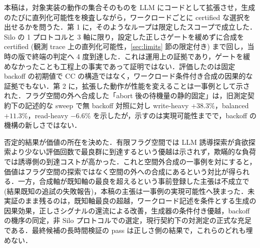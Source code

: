 \documentclass[submit,techrep,noauthor]{ipsj}
\begin{document}
本稿は，対象実装の動作の集合そのものを LLM にコードとして拡張させ，生成のたびに直列化可能性を検査しながら，ワークロードごとに certified な選択を出せるかを問うた．第 1 に，そのようなループは限定したスコープで成立した．Silo の 1 プロトコルと 3 軸に限り，設定した正しさゲートを緩めずに合成を certified (観測 trace 上の直列化可能性，\ref{sec:limits} 節の限定付き) まで回し，当時の版で終端の判定へ 4 度到達した．これは運用上の証拠であり，ゲートを緩めなかったことも工程上の事実であって証明ではない．評価したのは固定 backoff の初期値で CC の構造ではなく，ワークロード条件付き合成の因果的な証拠でもない．第 2 に，拡張した動作が性能を変えることは一事例として示された．フラグ空間の外へ合成した「abort 後の待機量の静的固定」は，旧測定契約下の記述的な sweep で無 backoff 対照に対し write-heavy $+38.3\%$，balanced $+11.3\%$，read-heavy $-6.6\%$ を示したが，示すのは実現可能性までで，backoff の機構の新しさではない．

否定的結果が価値の所在を決めた．有限フラグ空間では LLM 誘導探索が貪欲探索より少ない評価回数で最良群に到達するという優越は示されず，欺瞞的な負荷では誘導側の到達コストが高かった．これと空間外合成の一事例を対にすると，価値はフラグ空間の探索ではなく空間の外への合成にあるという対比が得られる．一方，合成軸が既知軸の最良を超えるという事前登録した主張は不成立で (結果既知の追試の失敗報告)，本稿の主張は一事例の実現可能性へ狭まった．未実証のまま残るのは，既知軸最良の超越，ワークロード記述を条件とする生成の因果効果，正しさシグナルの還流による改善，生成器の条件付き優越，backoff の機序の同定，非 Silo プロトコルでの選定，現行契約下の対測定の正式な充足である．最終候補の長時間検証の pass は正しさ側の結果で，これらのどれも埋めない．
\end{document}
